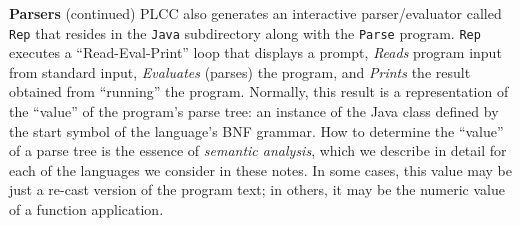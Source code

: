 \begin{minipage}[t]{\sw}
\slidenumber
\LARGE
{\bf Parsers} (continued)\exx
\LARGE
\emm\LightBox{\MYlonGrammarOnly}\exx
PLCC also generates an interactive parser/evaluator
called \verb'Rep' that resides in the \verb'Java' subdirectory
along with the \verb'Parse' program.
\verb'Rep' executes a ``Read-Eval-Print'' loop
that displays a prompt,
{\em Reads} program input from standard input,
{\em Evaluates} (parses) the program,
and {\em Prints} the result obtained
from ``running'' the program.
Normally, this result is a representation
of the ``value'' of the program's parse tree:
an instance of the Java class defined
by the start symbol of the language's BNF grammar.\exx
How to determine the ``value'' of a parse tree
is the essence of {\em semantic analysis},
which we describe in detail
for each of the languages we consider in these notes.
In some cases, this value may be just
a re-cast version of the program text;
in others, it may be the numeric value of a function application.\exx
\end{minipage}
\clearpage

